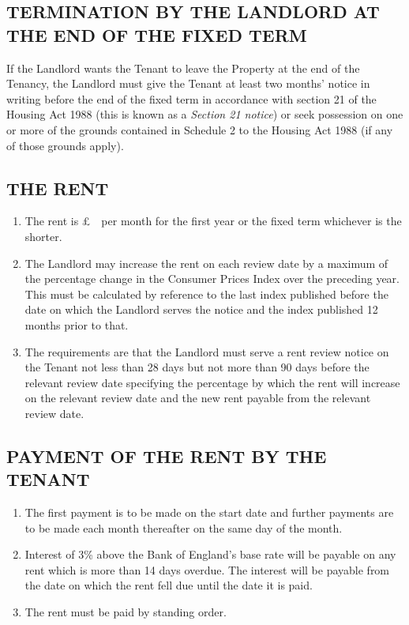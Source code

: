 \subsection{TERMINATION BY THE LANDLORD AT THE END OF THE FIXED TERM}

If the Landlord wants the Tenant to leave the Property at the end of the Tenancy, the Landlord must give the Tenant at least two months' notice in writing before the end of the fixed term in accordance with section 21 of the Housing Act 1988 (this is known as a  \emph{Section 21 notice}) or seek possession on one or more of the grounds contained in Schedule 2 to the Housing Act 1988 (if any of those grounds apply).

\subsection{THE RENT}
\begin{enumerate}
\item{The rent is \pounds\ \Rent\ per month for the first year or the fixed term whichever is the shorter.}

\item{The Landlord may increase the rent on each review date by a maximum of the percentage change in the Consumer Prices Index over the preceding year. This must be calculated by reference to the last index published before the date on which the Landlord serves the notice and the index published 12 months prior to that.}

\item{The requirements are that the Landlord must serve a rent review notice on the Tenant not less than 28 days but not more than 90 days before the relevant review date specifying the percentage by which the rent will increase on the relevant review date and the new rent payable from the relevant review date.}
\end{enumerate}

\subsection{PAYMENT OF THE RENT BY THE TENANT}
\begin{enumerate}

\item{The first payment is to be made on the start date and further payments are to be made each month thereafter on the same day of the month.}

\item{Interest of 3\% above the Bank of England's base rate will be payable on any rent which is more than 14 days overdue. The interest will be payable from the date on which the rent fell due until the date it is paid.}

\item{The rent must be paid by standing order.}
\end{enumerate}


